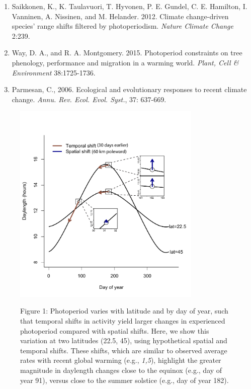 \documentclass[10.5pt,a4paper]{letter}
\begin{document}
\begin{letter}{}
\begin{footnotesize}
\begin{enumerate}
\item Saikkonen, K., K. Taulavuori, T. Hyvonen, P. E. Gundel, C. E. Hamilton, I. Vanninen, A. Nissinen, and M. Helander. 2012. Climate change-driven species' range shifts filtered by photoperiodism. \emph{Nature Climate Change} 2:239.
\item Way, D. A., and R. A. Montgomery. 2015. Photoperiod constraints on tree phenology, performance and migration in a warming world. \emph{Plant, Cell \& Environment} 38:1725-1736.
\item Parmesan, C., 2006. Ecological and evolutionary responses to recent climate change.  \emph{Annu. Rev. Ecol. Evol. Syst.}, 37: 637-669.
\end{enumerate}

\begin{figure}
\centering
\includegraphics[width=90mm,scale=0.5]{..//..//analyses/photoperiod/figures/photo_spacetime_v2.pdf} \\

\caption{Figure 1: Photoperiod varies with latitude and by day of year, such that temporal shifts in activity yield larger changes in experienced photoperiod compared with spatial shifts. Here, we show this variation at two latitudes (22.5\degree, 45\degree), using hypothetical spatial and temporal shifts. These shifts,
which are similar to observed average rates with recent global warming (e.g., \emph{1,5}), highlight the greater magnitude in daylength changes close to the equinox (e.g., day of
year 91), versus close to the summer solstice (e.g., day of year 182).}
 \label{fig:condiag}
 \end{figure}
 

\end{footnotesize}
\end{letter}
\end{document}
